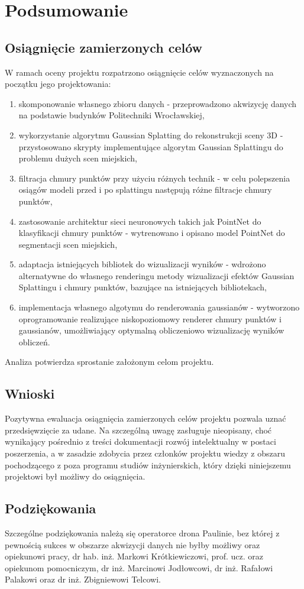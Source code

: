 \section{Podsumowanie}
\subsection{Osiągnięcie zamierzonych celów}

W ramach oceny projektu rozpatrzono osiągnięcie celów wyznaczonych na początku jego projektowania:

\begin{enumerate}
    \item skomponowanie własnego zbioru danych - przeprowadzono akwizycję danych na podstawie budynków Politechniki Wrocławskiej,
    \item wykorzystanie algorytmu Gaussian Splatting do rekonstrukcji sceny 3D - przystosowano skrypty implementujące algorytm Gaussian Splattingu do problemu dużych scen miejskich,
    \item filtracja chmury punktów przy użyciu różnych technik - w celu polepszenia osiągów modeli przed i po splattingu następują różne filtracje chmury punktów,
    \item zastosowanie architektur sieci neuronowych takich jak PointNet do klasyfikacji chmury punktów - wytrenowano i opisano model PointNet do segmentacji scen miejskich,
    \item adaptacja istniejących bibliotek do wizualizacji wyników - wdrożono alternatywne do własnego renderingu metody wizualizacji efektów Gaussian Splattingu i chmury punktów, bazujące na istniejących bibliotekach, 
    \item implementacja własnego algotymu do renderowania gaussianów - wytworzono oprogramowanie realizujące niskopoziomowy renderer chmury punktów i gaussianów, umożliwiający optymalną obliczeniowo wizualizację wyników obliczeń.
\end{enumerate}

Analiza potwierdza sprostanie założonym celom projektu.

\subsection{Wnioski}

Pozytywna ewaluacja osiągnięcia zamierzonych celów projektu pozwala uznać przedsięwzięcie za udane. Na szczególną uwagę zasługuje nieopisany, choć wynikający pośrednio z treści dokumentacji rozwój intelektualny w postaci poszerzenia, a w zasadzie zdobycia przez członków projektu wiedzy z obszaru pochodzącego z poza programu studiów inżynierskich, który dzięki niniejszemu projektowi był możliwy do osiągnięcia.

\subsection{Podziękowania}

Szczególne podziękowania należą się operatorce drona Paulinie, bez której z pewnością sukces w obszarze akwizycji danych nie byłby możliwy oraz opiekunowi pracy, dr hab. inż. Markowi Krótkiewiczowi, prof. ucz. oraz opiekunom pomocniczym, dr inż. Marcinowi Jodłowcowi, dr inż. Rafałowi Palakowi oraz dr inż. Zbigniewowi Telcowi.
